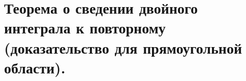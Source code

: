 \section{Теорема о сведении двойного интеграла к повторному (доказательство для прямоугольной области).}